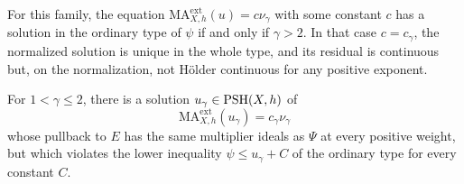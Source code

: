 \begin{theorem}\label{thm:unibranch-curve-density-endpoint}
For this family, the equation $\mathrm{MA}^{\mathrm{ext}}_{X,h}(u)=c\nu_\gamma$ with some constant $c$ has a solution in the ordinary type of $\psi$ if and only if $\gamma>2$. In that case $c=c_\gamma$, the normalized solution is unique in the whole type, and its residual is continuous but, on the normalization, not H\"older continuous for any positive exponent.

For $1<\gamma\leq2$, there is a solution $u_\gamma\in\mathrm{PSH}(X,h)$ of
\[
 \mathrm{MA}^{\mathrm{ext}}_{X,h}(u_\gamma)
          =c_\gamma\nu_\gamma
\]
whose pullback to $E$ has the same multiplier ideals as $\Psi$ at every positive weight, but which violates the lower inequality $\psi\leq u_\gamma+C$ of the ordinary type for every constant $C$.
\end{theorem}
